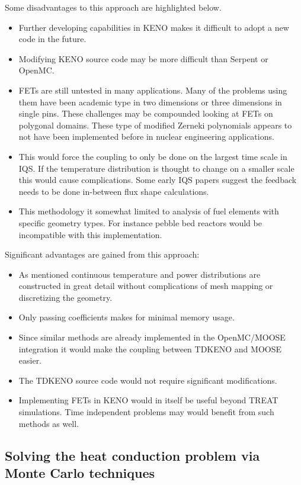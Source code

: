 \documentclass[11pt]{article}
\begin{document}
Some disadvantages to this approach are highlighted below.
	\begin{itemize}
	\item Further developing capabilities in KENO makes it difficult to adopt a new code in the future.
	\item Modifying KENO source code may be more difficult than Serpent or OpenMC.
	\item FETs are still untested in many applications.  Many of the problems using them have been academic type in two dimensions or three dimensions in single pins.  These challenges may be compounded looking at FETs on polygonal domains.  These type of modified Zerneki polynomials  appears to not have been implemented before in nuclear engineering applications. 
	\item This would force the coupling to only be done on the largest time scale in IQS.  If the temperature distribution is thought to change on a smaller scale this would cause complications.  Some early IQS papers suggest the feedback needs to be done in-between flux shape calculations. 
	\item This methodology it somewhat limited to analysis of fuel elements with specific geometry types.  For instance pebble bed reactors would be incompatible with this implementation.
	\end{itemize}

Significant advantages are gained from this approach:
	\begin{itemize}
	\item As mentioned continuous temperature and power distributions are constructed in great detail without complications of mesh mapping or discretizing the geometry.
	\item Only passing coefficients makes for minimal memory usage.
	\item Since similar methods are already implemented in  the OpenMC/MOOSE integration it would make the coupling between TDKENO and MOOSE easier. 
	\item The TDKENO source code would not require significant modifications. 
	\item Implementing FETs in KENO would in itself be useful beyond TREAT simulations.  Time independent problems may would benefit from such methods as well. 
	\end{itemize}


\subsection{Solving the heat conduction problem via Monte Carlo techniques}
\end{document}
